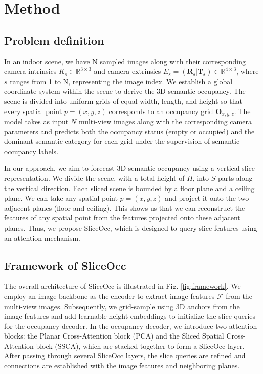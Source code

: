 \documentclass[letterpaper, 10 pt, conference]{ieeeconf}  %
\begin{document}
\section{Method}
\subsection{Problem definition}

In an indoor scene, we have N sampled images along with their corresponding camera intrinsics ${ K_s \in \mathbb{R}^{3\times3} }$ and camera extrinsics ${ E_s=(\mathbf{R_s}|\mathbf{T_s}) \in \mathbb{R}^{4\times3} }$, where $s$ ranges from 1 to N, representing the image index. We establish a global coordinate system within the scene to derive the 3D semantic occupancy. The scene is divided into uniform grids of equal width, length, and height so that every spatial point $p = (x, y, z)$ corresponds to an occupancy grid $\mathbf{O}_{x,y,z}$. The model takes as input $N$ multi-view images along with the corresponding camera parameters and predicts both the occupancy status (empty or occupied) and the dominant semantic category for each grid under the supervision of semantic occupancy labels.

In our approach, we aim to forecast 3D semantic occupancy using a vertical slice representation. We divide the scene, with a total height of $H$, into $S$ parts along the vertical direction. Each sliced scene is bounded by a floor plane and a ceiling plane. We can take any spatial point $p = (x, y, z)$ and project it onto the two adjacent planes (floor and ceiling). This shows us that we can reconstruct the features of any spatial point from the features projected onto these adjacent planes. Thus, we propose SliceOcc, which is designed to query slice features using an attention mechanism.
\subsection{Framework of SliceOcc}
The overall architecture of SliceOcc is illustrated in Fig. \ref{fig:framework}. We employ an image backbone as the encoder to extract image features $\mathcal{F}$ from the multi-view images. Subsequently, we grid-sample using 3D anchors from the image features and add learnable height embeddings to initialize the slice queries for the occupancy decoder. In the occupancy decoder, we introduce two attention blocks: the Planar Cross-Attention block (PCA) and the Sliced Spatial Cross-Attention block (SSCA), which are stacked together to form a SliceOcc layer. After passing through several SliceOcc layers, the slice queries are refined and connections are established with the image features and neighboring planes.
\end{document}
